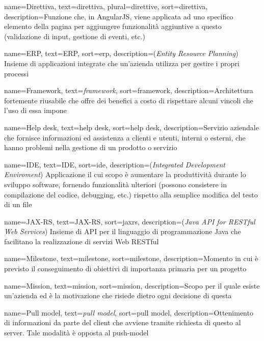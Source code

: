 {
    name={Direttiva},
    text=direttiva,
    plural=direttive,
    sort=direttiva,
    description={Funzione che, in AngularJS, viene applicata ad uno specifico elemento della pagina per aggiungere funzionalità aggiuntive a questo (validazione di input, gestione di eventi, etc.)}
}

{
    name={ERP},
    text=ERP,
    sort=erp,
    description={(\emph{Entity Resource Planning}) Insieme di applicazioni integrate che un'azienda utilizza per gestire i propri processi}
}

{
    name={Framework},
    text=\emph{framework},
    sort=framework,
    description={Architettura fortemente riusabile che offre dei benefici a costo di rispettare alcuni vincoli che l'uso di essa impone}
}

{
    name={Help desk},
    text=help desk,
    sort=help desk,
    description={Servizio aziendale che fornisce informazioni ed assistenza a clienti e utenti, interni o esterni, che hanno problemi nella gestione di un prodotto o servizio}
}

{
    name={IDE},
    text=IDE,
    sort=ide,
    description={(\emph{Integrated Development Enviroment}) Applicazione il cui scopo è aumentare la produttività durante lo sviluppo software, fornendo funzionalità ulteriori (possono consistere in compilazione del codice, debugging, etc.) rispetto alla semplice modifica del testo di un file}
}

{
    name={JAX-RS},
    text=JAX-RS,
    sort=jaxrs,
    description={(\emph{Java API for RESTful Web Services}) Insieme di API per il linguaggio di programmazione Java che facilitano la realizzazione di servizi Web RESTful}
}

{
    name={Milestone},
    text=milestone,
    sort=milestone,
    description={Momento in cui è previsto il conseguimento di obiettivi di importanza primaria per un progetto}
}

{
    name={Mission},
    text=mission,
    sort=mission,
    description={Scopo per il quale esiste un'azienda ed è la motivazione che risiede dietro ogni decisione di questa}
}

{
    name={Pull model},
    text=\emph{pull model},
    sort=pull model,
    description={Ottenimento di informazioni da parte del client che avviene
    tramite richiesta di questo al server. Tale modalità è opposta al
    \gls{push-model}}
}

